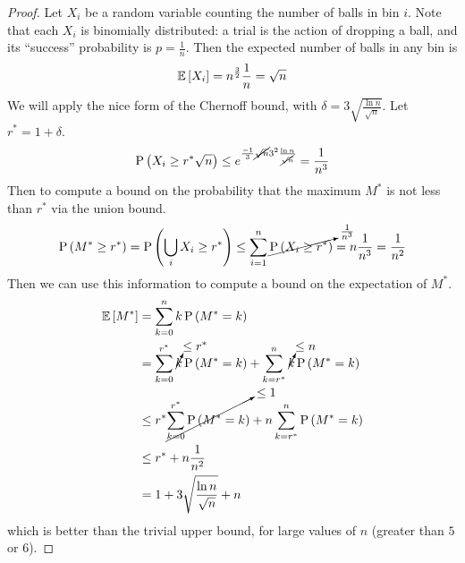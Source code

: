 \documentclass[11pt]{article}
\begin{document}
\begin{proof}
    Let $X_i$ be a random variable counting the number of balls in bin $i$.
    Note that each $X_i$ is binomially distributed:
    a trial is the action of dropping a ball, and its ``success'' probability
    is $p = \frac{1}{n}$.
    Then the expected number of balls in any bin is
    \begin{equation*}
        \E{X_i} = n^{\frac{3}{2}} \frac{1}{n} = \sqrt{n}
    \end{equation*}
    We will apply the nice form of the Chernoff bound, with
    $\delta = 3 \sqrt{\frac{\ln n}{\sqrt n}}$.
    Let $r^* = 1 + \delta$.
    \begin{equation*}
        \P{X_i \geq r^* \sqrt{n}}
        \leq e^{
            \frac{-1}{3} \cancel{\sqrt{n}} 3^2 \frac{\ln n}{\cancel{\sqrt n}}
        }
        = \frac{1}{n^3}
    \end{equation*}
    Then to compute a bound on the probability that the maximum $M^*$ is not
    less than $r^*$ via the union bound.
    \begin{equation*}
        \P{M^* \geq r^*}
        = \P{\Union_i X_i \geq r^*}
        \leq \sum_{i=1}^n \cancelto{\frac{1}{n^3}}{\P{X_i \geq r^*}}
        = n \frac{1}{n^3} = \frac{1}{n^2}
    \end{equation*}
    Then we can use this information to compute a bound on the expectation of
    $M^*$.
    \begin{align*}
        \E{M^*}
        &= \sum_{k=0}^n {k \P{M^* = k}} \\
        &= \sum_{k=0}^{r^*} {
            \cancelto{\leq r^*}{k} \P{M^* = k}
        }
        + \sum_{k=r^*}^{n} {
            \cancelto{\leq n}{k} \P{M^* = k}
        } \\
        &\leq
        r^* \cancelto{\leq 1}{
            \sum_{k=0}^{r^*} \P{M^* = k}
        }
        + n \sum_{k=r^*}^n { \P{M^* = k } } \\
        &\leq r^* + n \frac{1}{n^2} \\
        &= 1 + 3 \sqrt{\frac{\ln n}{\sqrt n}} + n
    \end{align*}
    which is better than the trivial upper bound, for large values of $n$
    (greater than $5$ or $6$).
\end{proof}
\end{document}
